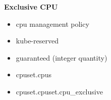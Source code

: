 \documentclass[usenames,dvipsnames, 18pt, compress, aspectratio=169]{beamer}
\begin{document}
\begin{frame}[fragile]{}
    \frametitle{}
    \begin{center}
        \textbf{Exclusive CPU}

        \begin{itemize}[label={\MVRightarrow}]
            \item cpu management policy
            \item kube-reserved
			\item guaranteed (integer quantity)
            \item cpuset.cpus
            \item cpuset.cpuset.cpu\_exclusive
        \end{itemize}

    \end{center}
\end{frame}
\end{document}
